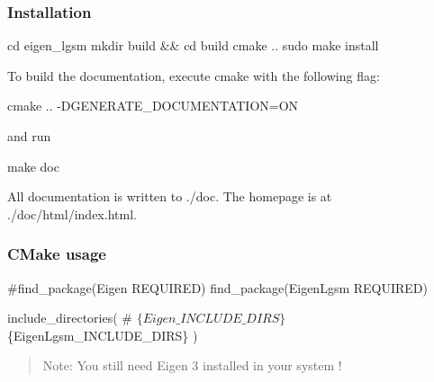 \subsubsection*{Installation}


\begin{DoxyCode}
cd eigen\_lgsm
mkdir build && cd build
cmake ..
sudo make install
\end{DoxyCode}
 To build the documentation, execute {\ttfamily cmake} with the following flag\+: 
\begin{DoxyCode}
cmake .. -DGENERATE\_DOCUMENTATION=ON
\end{DoxyCode}
 and run 
\begin{DoxyCode}
make doc
\end{DoxyCode}
 All documentation is written to {\ttfamily ./doc}. The homepage is at {\ttfamily ./doc/html/index.html}.

\subsubsection*{C\+Make usage}


\begin{DoxyCode}
#find\_package(Eigen REQUIRED)
find\_package(EigenLgsm REQUIRED)

include\_directories(
#   $\{Eigen\_INCLUDE\_DIRS\}
    $\{EigenLgsm\_INCLUDE\_DIRS\}
)
\end{DoxyCode}


\begin{quote}
Note\+: You still need Eigen 3 installed in your system !\end{quote}
